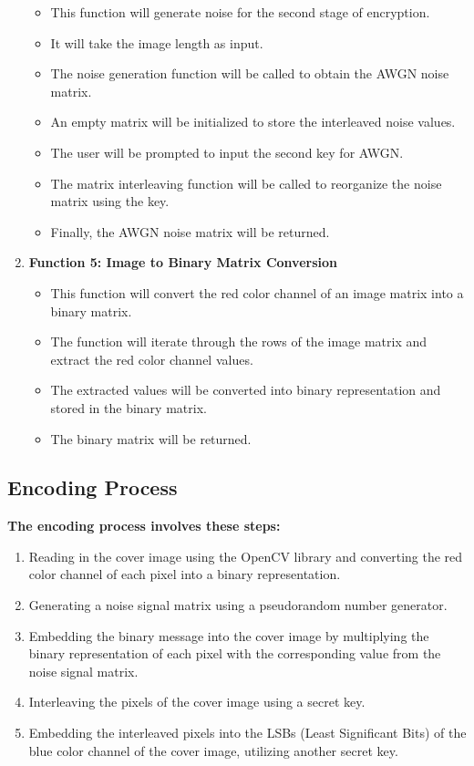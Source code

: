 \begin{enumerate}
    \begin{itemize}
        \item This function will generate noise for the second stage of encryption.
        \item It will take the image length as input.
        \item The noise generation function will be called to obtain the AWGN noise matrix.
        \item An empty matrix will be initialized to store the interleaved noise values.
        \item The user will be prompted to input the second key for AWGN.
        \item The matrix interleaving function will be called to reorganize the noise matrix using the key.
        \item Finally, the AWGN noise matrix will be returned.
    \end{itemize}
    \item \textbf{Function 5: Image to Binary Matrix Conversion}
    \begin{itemize}
        \item This function will convert the red color channel of an image matrix into a binary matrix.
        \item The function will iterate through the rows of the image matrix and extract the red color channel values.
        \item The extracted values will be converted into binary representation and stored in the binary matrix.
        \item The binary matrix will be returned.
    \end{itemize}
\end{enumerate}
\newpage
\subsection{Encoding Process}
\textbf{The encoding process involves these steps:}
\begin{enumerate}
    \item Reading in the cover image using the OpenCV library and converting the red color channel of each pixel into a binary representation.
    \item Generating a noise signal matrix using a pseudorandom number generator.
    \item Embedding the binary message into the cover image by multiplying the binary representation of each pixel with the corresponding value from the noise signal matrix.
    \item Interleaving the pixels of the cover image using a secret key.
    \item Embedding the interleaved pixels into the LSBs (Least Significant Bits) of the blue color channel of the cover image, utilizing another secret key.
\end{enumerate}


